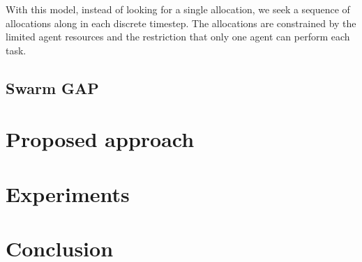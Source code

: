 \documentclass[conference]{IEEEtran}
\begin{document}
With this model, instead of looking for a single allocation, we seek a sequence of allocations along in each discrete timestep. The allocations are constrained by the limited agent resources and the restriction that only one agent can perform each task.

\subsection{Swarm GAP}
\label{sec:swarmgap}


\section{Proposed approach}
\label{sec:approach}


\section{Experiments}

\section{Conclusion}


%
%
\end{document}
